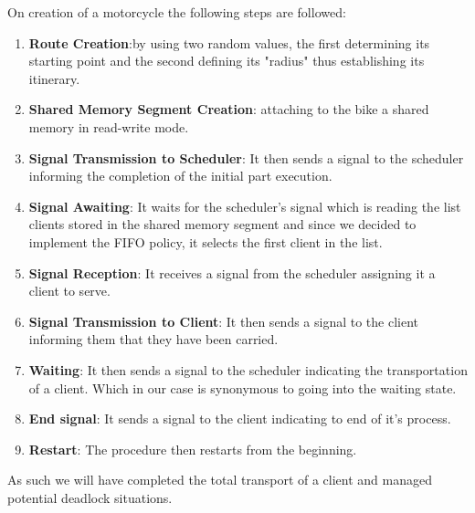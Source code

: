 On creation of a motorcycle the following steps are followed:
\begin{enumerate}
  \item \textbf{Route Creation}:by using two random values, the first determining its starting point and the second defining its "radius" thus establishing its itinerary.
  \item \textbf{Shared Memory Segment Creation}: attaching to the bike a shared memory in read-write mode.
  \item \textbf{Signal Transmission to Scheduler}: It then sends a signal to the scheduler informing the completion of the initial part execution.
  \item \textbf{Signal Awaiting}: It waits for the scheduler's signal which is reading the list clients stored in the shared memory segment and since we decided to implement the FIFO policy, it selects the first client in the list.
  \item \textbf{Signal Reception}: It receives a signal from the scheduler assigning it a client to serve.
  \item \textbf{Signal Transmission to Client}: It then sends a signal to the client informing them that they have been carried.
  \item \textbf{Waiting}: It then sends a signal to the scheduler indicating the transportation of a client. Which in our case is synonymous to going into the waiting state.
  \item \textbf{End signal}: It sends a signal to the client indicating to end of it's process.
  \item \textbf{Restart}: The procedure then restarts from the beginning.
\end{enumerate}

As such we will have completed the total transport of a client and managed potential deadlock situations.

